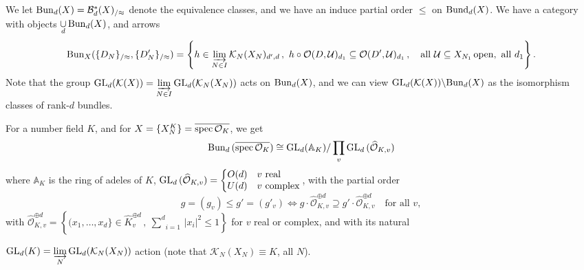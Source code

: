 \documentclass[leqno]{article}
\numberwithin{equation}{section}
\begin{document}
We let ${\rm Bun}_d (X) = {\mathcal B}_d^* (X)_{/\approx}$ denote the equivalence classes, and we have an induce partial order $\leq$ on ${\rm Bund}_d (X)$. We have a category with objects $\underset{d}{\cup} \, {\rm Bun}_d (X)$, and arrows 
\begin{equation}
\label{eq1116}
{\rm Bun}_X (\{D_N\}_{/\approx} , \{D'_N\}_{/\approx}) = \left\{ h \in \varinjlim_{N \in I} {\mathcal K}_N(X_N)_{d',d} \, , \ h \circ {\mathcal O} (D,{\mathcal U})_{d_1} \subseteq {\mathcal O} (D' , {\mathcal U})_{d_1} \, , \quad {\rm all} \ {\mathcal U} \subseteq X_{N_1} \, {\rm open}, \ {\rm all} \ d_1 \right\} .
\end{equation}
Note that the group ${\rm GL}_d ({\mathcal K} (X)) = \underset{N \in I}{\varinjlim} \, {\rm GL}_d ({\mathcal K}_N (X_N))$ acts on ${\rm Bun}_d (X)$, and we can view ${\rm GL}_d ({\mathcal K} (X)) \backslash {\rm Bun}_d (X)$ as the isomorphism classes of rank-$d$ bundles.

\smallskip

For a number field $K$, and for $X = \{ X_N^K \} = \overline{{\rm spec} \, {\mathcal O}_K}$, we get
\begin{equation}
\label{eq1117}
{\rm Bun}_d \, (\overline{{\rm spec} \, {\mathcal O}_K}) \cong {\rm GL}_d ({\mathbb A}_K) / \prod_v {\rm GL}_d \, (\widehat{\mathcal O}_{K,v})
\end{equation}
where ${\mathbb A}_K$ is the ring of adeles of $K$, ${\rm GL}_d \, (\widehat{\mathcal O}_{K,v}) = \left\{ \begin{matrix} O(d) &v \ {\rm real} \hfill \\ U(d) &v \ {\rm complex} \end{matrix} \right.$, with the partial order
\begin{equation}
\label{eq1118}
g = (g_v) \leq g' = (g'_v) \Leftrightarrow g \cdot \widehat{\mathcal O}_{K,v}^{\oplus d} \supseteq g' \cdot \widehat{\mathcal O}_{K,v}^{\oplus d} \quad \mbox{for all $v$},
\end{equation}
with $\widehat{\mathcal O}_{K,v}^{\oplus d} = \left\{ (x_1 , \ldots , x_d \} \in \widehat K_v^{\oplus d} \, , \ \underset{i=1}{\overset{d}\sum} \, \vert x_i \vert^2 \leq 1 \right\}$ for $v$ real or complex, and with its natural 

\smallskip

\noindent ${\rm GL}_d (K) = \underset{N}{\varinjlim} \, {\rm GL}_d ({\mathcal K}_N (X_N))$ action (note that ${\mathcal K}_N (X_N) \equiv K$, all $N$). 

\smallskip
\end{document}
